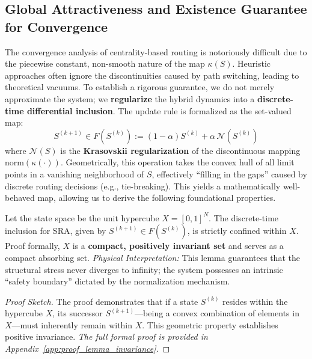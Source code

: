\documentclass{ccjnl}
\begin{document}
\subsection{Global Attractiveness and Existence Guarantee for Convergence}
\label{subsec:attractivity}

The convergence analysis of centrality-based routing is notoriously difficult due to the piecewise constant, non-smooth nature of the map $\kappa(S)$. 
Heuristic approaches often ignore the discontinuities caused by path switching, leading to theoretical vacuums.
To establish a rigorous guarantee, we do not merely approximate the system; we \textbf{regularize} the hybrid dynamics into a \textbf{discrete-time differential inclusion}. 
The update rule is formalized as the set-valued map:
\begin{equation}\label{eq:inclusion_map}
S^{(k+1)} \in F(S^{(k)}) := (1-\alpha)S^{(k)}+\alpha\,\mathcal{N}(S^{(k)})
\end{equation}
where $\mathcal{N}(S)$ is the \textbf{Krasovskii regularization} of the discontinuous mapping $\mathrm{norm}(\kappa(\cdot))$. 
Geometrically, this operation takes the convex hull of all limit points in a vanishing neighborhood of $S$, effectively ``filling in the gaps'' caused by discrete routing decisions (e.g., tie-breaking). 
This yields a mathematically well-behaved map, allowing us to derive the following foundational properties.

\begin{lemma}
\label{lemma:invariance}
Let the state space be the unit hypercube $X=[0,1]^N$. 
The discrete-time inclusion for SRA, given by $S^{(k+1)}\in F(S^{(k)})$, is strictly confined within $X$. 
Proof formally, $X$ is a \textbf{compact, positively invariant set} and serves as a compact absorbing set.
\textit{Physical Interpretation:} This lemma guarantees that the structural stress never diverges to infinity; the system possesses an intrinsic ``safety boundary'' dictated by the normalization mechanism.
\end{lemma}
\begin{proof}[Proof Sketch]
The proof demonstrates that if a state $S^{(k)}$ resides within the hypercube $X$, its successor $S^{(k+1)}$---being a convex combination of elements in $X$---must inherently remain within $X$. This geometric property establishes positive invariance. \textit{The full formal proof is provided in Appendix~\ref{app:proof_lemma_invariance}.}
\end{proof}
\end{document}
